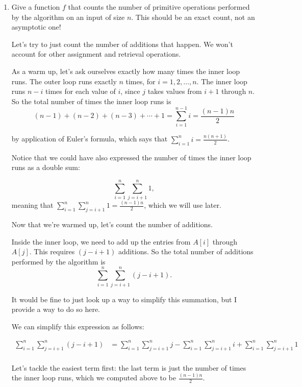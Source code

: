 \documentclass[11pt]{article}
\begin{document}
\begin{enumerate}
\begin{enumerate}

    
\item 
Give a function $f$ that counts the number of primitive operations performed by
the algorithm on an input of size $n$. This should be an exact count, not an
asymptotic one!

\begin{Solution}
    Let's try to just count the number
    of additions that happen.  We won't account for other assignment and
    retrieval operations.
    
    As a warm up, let's ask ourselves exactly how many times
    the inner loop runs.
    The outer loop runs exactly $n$ times, for $i = 1, 2, \ldots, n$. The inner loop runs
    $n - i$ times for each value of $i$, since $j$ takes values from $i + 1$
    through $n$. So the total number of times the inner loop runs is
    \[
        (n - 1) + (n - 2) + (n - 3) + \cdots + 1 = \sum_{i=1}^{n-1} i = \frac{(n-1)n}{2}
    \]

    by application of Euler's formula, which says that $\sum_{i=1}^{n} i = \frac{n(n+1)}{2}$.

    Notice that we could have also expressed the number of times the inner loop runs as a double sum:

    \[
    \sum_{i=1}^{n} \sum_{j=i+1}^{n} 1,
    \]
    meaning that $\sum_{i=1}^{n} \sum_{j=i+1}^{n} 1 = \frac{(n-1)n}{2}$, which we will use later.

    Now that we're warmed up, let's count the number of additions.

    Inside the inner loop, we need to add up the entries from $A[i]$ through
    $A[j]$. This requires $(j - i + 1)$ additions. So the total number of
    additions performed by the algorithm is 
    \[
        \sum_{i=1}^{n} \sum_{j=i+1}^{n} (j - i + 1).
    \]

    It would be fine to just look up a way to simplify this summation, but I provide a way to do so here.
    
    We can simplify this expression as follows:

    \begin{align*}
        \sum_{i=1}^{n} \sum_{j=i+1}^{n} (j - i + 1) &= 
        \sum_{i=1}^{n} \sum_{j=i+1}^{n} j - \sum_{i=1}^{n} \sum_{j=i+1}^{n} i + \sum_{i=1}^{n} \sum_{j=i+1}^{n} 1 \\
   \end{align*}

Let's tackle the easiest term first: the last term is just the number of times
the inner loop runs, which we computed above to be $\frac{(n-1)n}{2}$.


\end{Solution}
\end{enumerate}
\end{enumerate}
\end{document}
